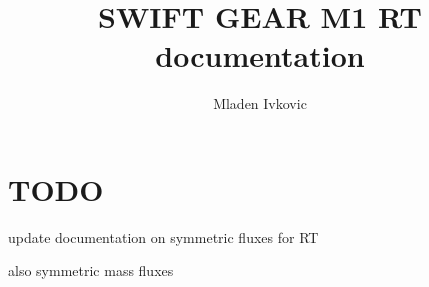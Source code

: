 



\newcommand{\deprecated}[1]{\textcolor{red}{NOTE: DEPRECATED \$\$ }\textcolor{gray}{\textit{#1}} \textcolor{red}{\$\$}}


\title{SWIFT GEAR M1 RT documentation}
\author{Mladen Ivkovic}
\date{}










\maketitle
\tableofcontents
\clearpage


\section{TODO}

update documentation on symmetric fluxes for RT

also symmetric mass fluxes





















\appendix{}






